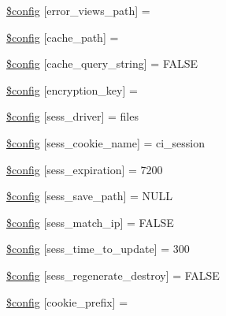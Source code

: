 \begin{DoxyCompactItemize}
\item 
\mbox{\hyperlink{config_8php_a7c49f60eb08b8ebddb5e5af1d02b2b72}{\$config}} \mbox{[}\textquotesingle{}error\+\_\+views\+\_\+path\textquotesingle{}\mbox{]} = \textquotesingle{}\textquotesingle{}
\item 
\mbox{\hyperlink{config_8php_a0f1391e01a3a0b76f22e6c0b5c0f47af}{\$config}} \mbox{[}\textquotesingle{}cache\+\_\+path\textquotesingle{}\mbox{]} = \textquotesingle{}\textquotesingle{}
\item 
\mbox{\hyperlink{config_8php_a70f4af0a439597d3d7f8be31a050867e}{\$config}} \mbox{[}\textquotesingle{}cache\+\_\+query\+\_\+string\textquotesingle{}\mbox{]} = F\+A\+L\+SE
\item 
\mbox{\hyperlink{config_8php_af43facf6a8ff007843b771513aa93dfe}{\$config}} \mbox{[}\textquotesingle{}encryption\+\_\+key\textquotesingle{}\mbox{]} = \textquotesingle{}\textquotesingle{}
\item 
\mbox{\hyperlink{config_8php_aaeca65cee3c00f9df76c74e352283c3c}{\$config}} \mbox{[}\textquotesingle{}sess\+\_\+driver\textquotesingle{}\mbox{]} = \textquotesingle{}files\textquotesingle{}
\item 
\mbox{\hyperlink{config_8php_a416e16954fea70dd96e9ff2134451b87}{\$config}} \mbox{[}\textquotesingle{}sess\+\_\+cookie\+\_\+name\textquotesingle{}\mbox{]} = \textquotesingle{}ci\+\_\+session\textquotesingle{}
\item 
\mbox{\hyperlink{config_8php_a233a1bb9ff2f169ef3cfa142121a25f7}{\$config}} \mbox{[}\textquotesingle{}sess\+\_\+expiration\textquotesingle{}\mbox{]} = 7200
\item 
\mbox{\hyperlink{config_8php_a3d653cf8ae8e24c6a336796f7447ccad}{\$config}} \mbox{[}\textquotesingle{}sess\+\_\+save\+\_\+path\textquotesingle{}\mbox{]} = N\+U\+LL
\item 
\mbox{\hyperlink{config_8php_ad61d051008d3524d24ba135bfeb1531f}{\$config}} \mbox{[}\textquotesingle{}sess\+\_\+match\+\_\+ip\textquotesingle{}\mbox{]} = F\+A\+L\+SE
\item 
\mbox{\hyperlink{config_8php_a2d88d1952ab601090523e0f8d4676578}{\$config}} \mbox{[}\textquotesingle{}sess\+\_\+time\+\_\+to\+\_\+update\textquotesingle{}\mbox{]} = 300
\item 
\mbox{\hyperlink{config_8php_a4d469f30b7e3539f5a90da887cc05be9}{\$config}} \mbox{[}\textquotesingle{}sess\+\_\+regenerate\+\_\+destroy\textquotesingle{}\mbox{]} = F\+A\+L\+SE
\item 
\mbox{\hyperlink{config_8php_a4a9435423f9b07e56b82b4a0d07a23d9}{\$config}} \mbox{[}\textquotesingle{}cookie\+\_\+prefix\textquotesingle{}\mbox{]} = \textquotesingle{}\textquotesingle{}

\end{DoxyCompactItemize}
